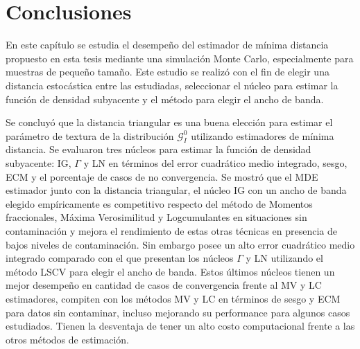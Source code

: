 \section{Conclusiones}

En este capítulo se estudia el desempeño del estimador de mínima distancia propuesto en esta tesis mediante una simulación Monte Carlo, especialmente para muestras de pequeño tamaño. Este estudio se realizó con el fin de elegir una distancia estocástica entre las estudiadas, seleccionar el núcleo para estimar la función de densidad subyacente y el método para elegir el ancho de banda.

Se concluyó que la distancia triangular es una buena elección para estimar el parámetro de textura de la distribución $\mathcal{G}_I^0$ utilizando estimadores de mínima distancia. Se evaluaron tres núcleos para estimar la función de densidad subyacente: IG, $\Gamma$ y LN en términos del error cuadrático medio integrado, sesgo, ECM y el porcentaje de casos de no convergencia. Se mostró que el MDE estimador junto con la distancia triangular, el núcleo IG con un ancho de banda elegido empíricamente es competitivo respecto del método de Momentos fraccionales, Máxima Verosimilitud y Logcumulantes en situaciones sin contaminación y mejora el rendimiento de estas otras técnicas en presencia de bajos niveles de contaminación. Sin embargo posee un alto error cuadrático medio integrado comparado con el que presentan los núcleos $\Gamma$ y LN utilizando el método LSCV para elegir el ancho de banda. Estos últimos núcleos tienen un mejor desempeño en cantidad de casos de convergencia frente al MV y LC estimadores, compiten con los métodos MV y LC en términos de sesgo y ECM para datos sin contaminar, incluso mejorando su performance para algunos casos estudiados. Tienen la desventaja de tener un alto costo computacional frente a las otros métodos de estimación.
